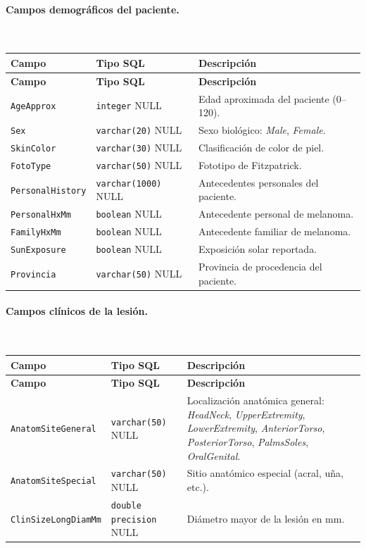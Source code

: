 \paragraph{Campos demográficos del paciente.}~

\begin{longtable}{|p{3.5cm}|p{4cm}|p{7cm}|}
\hline
\textbf{Campo} & \textbf{Tipo SQL} & \textbf{Descripción} \\
\hline
\endfirsthead
\hline
\textbf{Campo} & \textbf{Tipo SQL} & \textbf{Descripción} \\
\hline
\endhead
\texttt{AgeApprox} & \texttt{integer} NULL & Edad aproximada del paciente (0--120). \\
\hline
\texttt{Sex} & \texttt{varchar(20)} NULL & Sexo biológico: \textit{Male}, \textit{Female}. \\
\hline
\texttt{SkinColor} & \texttt{varchar(30)} NULL & Clasificación de color de piel. \\
\hline
\texttt{FotoType} & \texttt{varchar(50)} NULL & Fototipo de Fitzpatrick. \\
\hline
\texttt{PersonalHistory} & \texttt{varchar(1000)} NULL & Antecedentes personales del paciente. \\
\hline
\texttt{PersonalHxMm} & \texttt{boolean} NULL & Antecedente personal de melanoma. \\
\hline
\texttt{FamilyHxMm} & \texttt{boolean} NULL & Antecedente familiar de melanoma. \\
\hline
\texttt{SunExposure} & \texttt{boolean} NULL & Exposición solar reportada. \\
\hline
\texttt{Provincia} & \texttt{varchar(50)} NULL & Provincia de procedencia del paciente. \\
\hline


\end{longtable}

\paragraph{Campos clínicos de la lesión.}~

\begin{longtable}{|p{3.5cm}|p{4cm}|p{7cm}|}
\hline
\textbf{Campo} & \textbf{Tipo SQL} & \textbf{Descripción} \\
\hline
\endfirsthead
\hline
\textbf{Campo} & \textbf{Tipo SQL} & \textbf{Descripción} \\
\hline
\endhead
\texttt{AnatomSite\-General} & \texttt{varchar(50)} NULL & Localización anatómica general: \textit{HeadNeck}, \textit{UpperExtremity}, \textit{LowerExtremity}, \textit{AnteriorTorso}, \textit{PosteriorTorso}, \textit{PalmsSoles}, \textit{OralGenital}. \\
\hline
\texttt{AnatomSite\-Special} & \texttt{varchar(50)} NULL & Sitio anatómico especial (acral, uña, etc.). \\
\hline
\texttt{ClinSizeLong\-DiamMm} & \texttt{double precision} NULL & Diámetro mayor de la lesión en mm. \\
\hline
\end{longtable}

